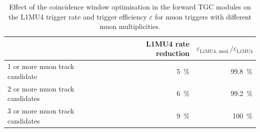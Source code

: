\begin{table}[!ht]
\caption{Effect of the coincidence window optimisation in the forward TGC modules on the L1MU4 trigger rate and trigger efficiency \(\varepsilon\) for muon triggers with different muon multiplicities.}
\label{tab:trigger:l1mu4:results}
\centering
\begin{tabular}{l rr }
\toprule
                          & L1MU4 rate reduction & \(\varepsilon_{\text{L1MU4, mod.}} / \varepsilon_{\text{L1MU4}}\)\\
\midrule
1 or more muon track candidate & \SI{5}{\percent} & \SI{99.8}{\percent} \\
2 or more muon track candidates & \SI{6}{\percent} & \SI{99.2}{\percent} \\
3 or more muon track candidates & \SI{9}{\percent} & \SI{100}{\percent} \\
\bottomrule
\end{tabular}
\end{table}
